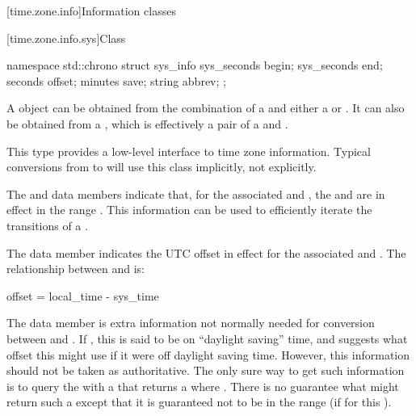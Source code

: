 [time.zone.info]{Information classes}

[time.zone.info.sys]{Class }

\begin{codeblock}
namespace std::chrono {
  struct sys_info {
    sys_seconds   begin;
    sys_seconds   end;
    seconds       offset;
    minutes       save;
    string        abbrev;
  };
}
\end{codeblock}

\pnum
A  object can be obtained
from the combination of a  and
either a  or .
It can also be obtained from a ,
which is effectively a pair of a  and .

\pnum
\begin{note}
This type provides a low-level interface to time zone information.
Typical conversions from  to 
will use this class implicitly, not explicitly.
\end{note}

\pnum
{}%
%
The  and  data members indicate that,
for the associated  and ,
the  and  are in effect in the range .
This information can be used to efficiently iterate the transitions of a .

\pnum
{}%
The  data member indicates
the UTC offset in effect
for the associated  and .
The relationship between  and  is:

\begin{codeblock}
offset = local_time - sys_time
\end{codeblock}

\pnum
{}%
The  data member is extra information not normally needed
for conversion between  and .
If , this  is said to be on ``daylight saving'' time,
and  suggests what offset this  might use
if it were off daylight saving time.
However, this information should not be taken as authoritative.
The only sure way to get such information
is to query the  with a 
that returns a  where .
There is no guarantee what  might return such a 
except that it is guaranteed not to be in the range 
(if  for this ).

